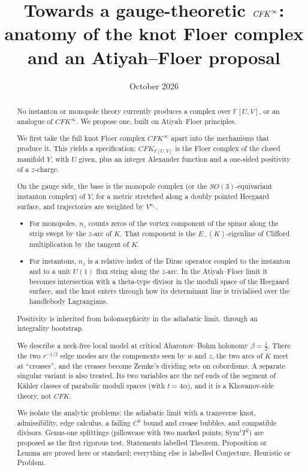 \documentclass[11pt]{amsart}
\title[Towards a gauge-theoretic $\CFK^\infty$]{Towards a gauge-theoretic $\CFK^{\infty}$:\\
anatomy of the knot Floer complex and an Atiyah--Floer proposal}
\date{October 2026}
\theoremstyle{definition}
\theoremstyle{remark}
\newcommand{\F}{\mathbb{F}}
\newcommand{\CFK}{\mathit{CFK}}
\begin{document}
\begin{abstract}
No instanton or monopole theory currently produces a complex over $\F[U,V]$, or an analogue of $\CFK^\infty$.
We propose one, built on Atiyah--Floer principles.

We first take the full knot Floer complex $\CFK^\infty$ apart into the mechanisms that produce it.  This yields a
specification: $\CFK_{\F[U,V]}$ is the Floer complex of the closed manifold $Y$, with $U$ given, plus an integer Alexander
function and a one-sided positivity of a $z$-charge.

On the gauge side, the base is the monopole complex (or the $SO(3)$-equivariant instanton complex) of $Y$, for a metric
stretched along a doubly pointed Heegaard surface, and trajectories are weighted by $V^{n_z}$.
\begin{itemize}
\item For monopoles, $n_z$ counts zeros of the vortex component of the spinor along the strip swept by the $z$-arc of $K$.
That component is the $E_-(\dot K)$-eigenline of Clifford multiplication by the tangent of $K$.
\item For instantons, $n_z$ is a relative index of the Dirac operator coupled to the instanton and to a unit $U(1)$ flux
string along the $z$-arc.  In the Atiyah--Floer limit it becomes intersection with a theta-type divisor in the moduli
space of the Heegaard surface, and the knot enters through how its determinant line is trivialised over the handlebody
Lagrangians.
\end{itemize}
Positivity is inherited from holomorphicity in the adiabatic limit, through an integrality bootstrap.

We describe a neck-free local model at critical Aharonov--Bohm holonomy $\beta=\tfrac12$.  There the two
$r^{-1/2}$ edge modes are the components seen by $w$ and $z$, the two arcs of $K$ meet at ``creases'', and the creases
become Zemke's dividing sets on cobordisms.  A separate singular variant is also treated.  Its two variables are the
nef ends of the segment of Kähler classes of parabolic moduli spaces (with $t=4\alpha$), and it is a Khovanov-side
theory, not $\CFK$.

We isolate the analytic problems: the adiabatic limit with a transverse knot, admissibility, edge calculus, a
failing $C^0$ bound and crease bubbles, and compatible divisors.  Genus-one splittings (pillowcase with two marked
points; $\mathrm{Sym}^1T^2$) are proposed as the first rigorous test.  Statements labelled Theorem, Proposition or Lemma
are proved here or standard; everything else is labelled Conjecture, Heuristic or Problem.
\end{abstract}
\maketitle
\setcounter{tocdepth}{1}
\tableofcontents








\end{document}
